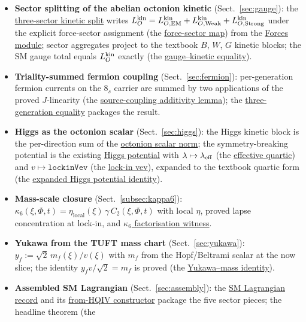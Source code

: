 \documentclass[11pt]{amsart}
\begin{document}
\begin{itemize}[leftmargin=2em]
\item \textbf{Sector splitting of the abelian octonion kinetic}
  (Sect.~\ref{sec:gauge}): the
  \hyperref[lean:LO-kinetic-split]{three-sector kinetic split} writes
  $L_O^{\rm kin}=L_{O,{\rm EM}}^{\rm kin}+L_{O,{\rm Weak}}^{\rm kin}+L_{O,{\rm Strong}}^{\rm kin}$
  under the explicit force-sector assignment (the
  \hyperref[lean:O-to-sector]{force-sector map}) from the
  \hyperref[lean:forces]{Forces module}; sector aggregates project to
  the textbook $B$, $W$, $G$ kinetic blocks; the SM gauge total equals
  $L_O^{\rm kin}$ exactly (the
  \hyperref[lean:gauge-eq-kin]{gauge--kinetic equality}).
\item \textbf{Triality-summed fermion coupling} (Sect.~\ref{sec:fermion}):
  per-generation fermion currents on the $8_s$ carrier are summed by two
  applications of the proved $J$-linearity (the
  \hyperref[lean:J-add]{source-coupling additivity lemma}); the
  \hyperref[lean:three-gen]{three-generation equality} packages the result.
\item \textbf{Higgs as the octonion scalar} (Sect.~\ref{sec:higgs}):
  the Higgs kinetic block is the per-direction sum of the
  \hyperref[lean:scalar-norm]{octonion scalar norm}; the
  symmetry-breaking potential is the existing
  \hyperref[lean:higgs-pot]{Higgs potential} with
  $\lambda\mapsto\lambda_{\rm eff}$ (the
  \hyperref[lean:lambda-eff]{effective quartic}) and
  $v\mapsto\texttt{lockinVev}$ (the
  \hyperref[lean:lockin-vev]{lock-in vev}), expanded to the textbook
  quartic form (the
  \hyperref[lean:higgs-expanded]{expanded Higgs potential identity}).
\item \textbf{Mass-scale closure} (Sect.~\ref{subsec:kappa6}):
  $\kappa_6(\xi,\Phi,t)=\eta_{\mathrm{local}}(\xi)\,\gamma\,C_2(\xi,\Phi,t)$
  with local $\eta$, proved lapse concentration at lock-in, and
  \hyperref[lean:kappa6-factorisation]{$\kappa_6$ factorisation witness}.
\item \textbf{Yukawa from the TUFT mass chart} (Sect.~\ref{sec:yukawa}):
  $y_f := \sqrt{2}\,m_f(\xi)/v(\xi)$ with $m_f$ from the Hopf/Beltrami
  scalar at the now slice; the identity $y_f v / \sqrt{2}=m_f$ is proved
  (the \hyperref[lean:yukawa-mass]{Yukawa--mass identity}).
\item \textbf{Assembled SM Lagrangian} (Sect.~\ref{sec:assembly}):
  the \hyperref[lean:SM-record]{SM Lagrangian record} and its
  \hyperref[lean:SM-fromHQIV]{from-HQIV constructor} package the five
  sector pieces; the headline theorem (the

\end{itemize}
\end{document}

